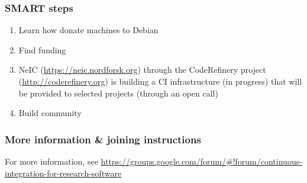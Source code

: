\subsubsection{SMART steps}

\begin{enumerate}
\item Learn how donate machines to Debian
\item Find funding
\item NeIC (\url{https://neic.nordforsk.org}) through the CodeRefinery project (\url{http://coderefinery.org}) is building a CI infrastructure (in progress) that will be provided to selected projects (through an open call)
\item Build community
\end{enumerate}


\subsubsection{More information \& joining instructions}

For more information, see \url{https://groups.google.com/forum/#!forum/continuous-integration-for-research-software}

